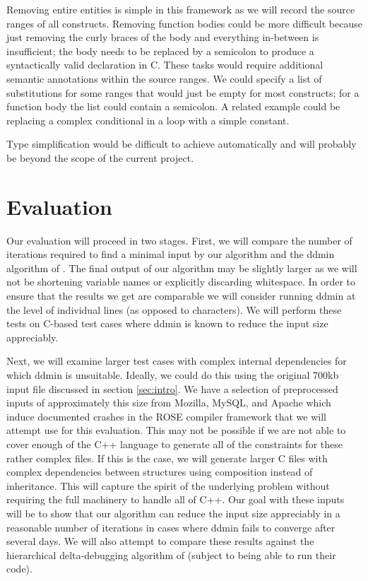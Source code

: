 \documentclass[11pt]{article}
\begin{document}
Removing entire entities is simple in this framework as we will record the
source ranges of all constructs.  Removing function bodies could be more
difficult because just removing the curly braces of the body and everything
in-between is insufficient; the body needs to be replaced by a semicolon to
produce a syntactically valid declaration in C. These tasks would require
additional semantic annotations within the source ranges. We could specify a
list of substitutions for some ranges that would just be empty for most
constructs; for a function body the list could contain a semicolon.  A related
example could be replacing a complex conditional in a loop with a simple
constant.

Type simplification would be difficult to achieve automatically and will
probably be beyond the scope of the current project.

\section{Evaluation}
Our evaluation will proceed in two stages.  First, we will compare the number of
iterations required to find a minimal input by our algorithm and the ddmin
algorithm of \citeauthor{dd}.  The final output of our algorithm may be slightly
larger as we will not be shortening variable names or explicitly discarding
whitespace.  In order to ensure that the results we get are comparable we will
consider running ddmin at the level of individual lines (as opposed to
characters). We will perform these tests on C-based test cases where ddmin is
known to reduce the input size appreciably.

Next, we will examine larger test cases with complex internal dependencies for
which ddmin is unsuitable.  Ideally, we could do this using the original 700kb
input file discussed in section \ref{sec:intro}.  We have a selection of
preprocessed inputs of approximately this size from Mozilla, MySQL, and Apache
which induce documented crashes in the ROSE compiler framework \citep{rose} that
we will attempt use for this evaluation.  This may not be possible if we are not
able to cover enough of the C++ language to generate all of the constraints for
these rather complex files.  If this is the case, we will generate larger C
files with complex dependencies between structures using composition instead of
inheritance.  This will capture the spirit of the underlying problem without
requiring the full machinery to handle all of C++.  Our goal with these inputs
will be to show that our algorithm can reduce the input size appreciably in a
reasonable number of iterations in cases where ddmin fails to converge after
several days. We will also attempt to compare these results against the
hierarchical delta-debugging algorithm of \citeauthor{hdd} (subject to being
able to run their code).
\end{document}
